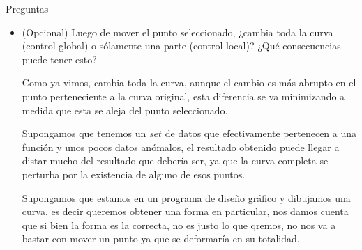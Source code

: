 \begin{section}{Preguntas}
\begin{itemize}
	\item (Opcional) Luego de mover el punto seleccionado, ¿cambia toda la curva (control global) o sólamente una parte (control local)? ¿Qué consecuencias puede tener esto?
	
	Como ya vimos, cambia toda la curva, aunque el cambio es más abrupto en el punto perteneciente a la curva original, esta diferencia se va minimizando a medida que esta se aleja del punto seleccionado.
	
	Supongamos que tenemos un $set$ de datos que efectivamente pertenecen a una función y unos pocos datos anómalos, el resultado obtenido puede llegar a distar mucho del resultado que debería ser, ya que la curva completa se perturba por la existencia de alguno de esos puntos.
	
	Supongamos que estamos en un programa de diseño gráfico y dibujamos una curva, es decir queremos obtener una forma en particular, nos damos cuenta que si bien la forma es la correcta, no es justo lo que qremos, no nos va a bastar con mover un punto ya que se deformaría en su totalidad.


	\end{itemize}	
\end{section}

